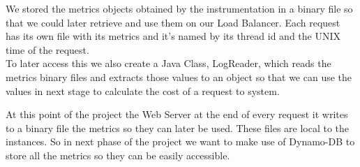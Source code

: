 \documentclass[times, 10pt,twocolumn]{article}
\begin{document}
   We stored the metrics objects obtained by the instrumentation in a binary
   file so that we could later retrieve and use them on our Load Balancer. Each 
   request has its own file with its metrics and it's named by its thread id 
   and the UNIX time of the request.\\
   To later access this we also create a Java Class, LogReader, which reads
   the metrics binary files and extracts those values to an object so that 
   we can use the values in next stage to calculate the cost of a request to
   system.


   At this point of the project the Web Server at the end of every request 
   it writes to a binary file the metrics so they can later be used. These files
   are local to the instances. So in next phase of the project we want to make use
   of Dynamo-DB to store all the metrics so they can be easily accessible.


\nocite{ex1,ex2}


\end{document}
